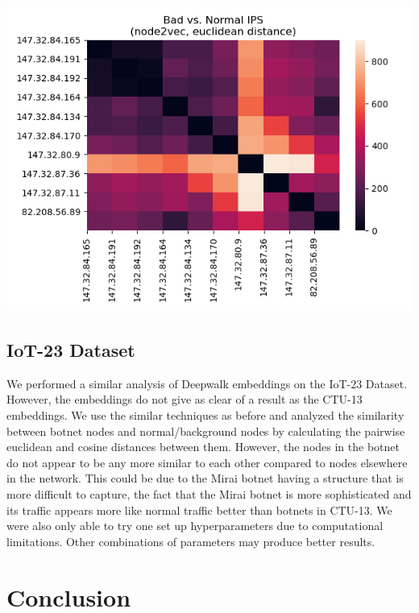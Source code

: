 \documentclass[10pt]{article}
\begin{document}
\begin{multicols}{2}
\includegraphics[scale=.5]{2b}


\subsection{IoT-23 Dataset}

We performed a similar analysis of Deepwalk embeddings on the IoT-23 Dataset. However, the embeddings do not give as clear of a result as the CTU-13 embeddings. We use the similar techniques as before and analyzed the similarity between botnet nodes and normal/background nodes by calculating the pairwise euclidean and cosine distances between them. However, the nodes in the botnet do not appear to be any more similar to each other compared to nodes elsewhere in the network. This could be due to the Mirai botnet having a structure that is more difficult to capture, the fact that the Mirai botnet is more sophisticated and its traffic appears more like normal traffic better than botnets in CTU-13. We were also only able to try one set up hyperparameters due to computational limitations. Other combinations of parameters may produce better results. 

\section{Conclusion}


\end{multicols}
\end{document}
